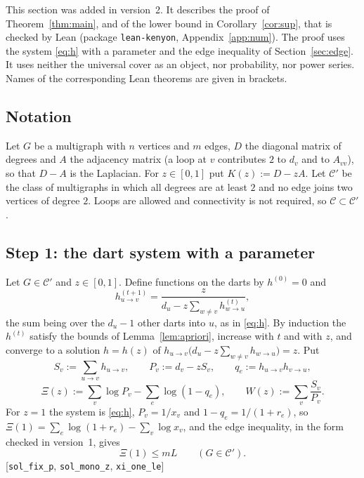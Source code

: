 \documentclass[11pt]{amsart}
\theoremstyle{plain}
\theoremstyle{remark}
\newcommand{\cC}{\mathcal{C}}
\newcommand{\code}[1]{\texttt{#1}}
\begin{document}
This section was added in version~2. It describes the proof of Theorem~\ref{thm:main}, and of the lower bound in
Corollary~\ref{cor:sup}, that is checked by Lean (package \code{lean-kenyon}, Appendix~\ref{app:num}). The proof
uses the system \eqref{eq:h} with a parameter and the edge inequality of Section~\ref{sec:edge}. It uses neither
the universal cover as an object, nor probability, nor power series. Names of the corresponding Lean theorems
are given in brackets.

\subsection*{Notation}
Let $G$ be a multigraph with $n$ vertices and $m$ edges, $D$ the diagonal matrix of degrees and $A$ the adjacency
matrix (a loop at $v$ contributes $2$ to $d_v$ and to $A_{vv}$), so that $D-A$ is the Laplacian. For $z\in[0,1]$
put $K(z):=D-zA$. Let $\cC'$ be the class of multigraphs in which all degrees are at least $2$ and no edge joins
two vertices of degree $2$. Loops are allowed and connectivity is not required, so $\cC\subset\cC'$.

\subsection*{Step 1: the dart system with a parameter}
Let $G\in\cC'$ and $z\in[0,1]$. Define functions on the darts by $h^{(0)}=0$ and
\begin{equation}\label{eq:hz}
  h^{(t+1)}_{u\to v}=\frac{z}{d_u-z\sum_{w\ne v}h^{(t)}_{w\to u}},
\end{equation}
the sum being over the $d_u-1$ other darts into $u$, as in \eqref{eq:h}. By induction the $h^{(t)}$ satisfy the
bounds of Lemma~\ref{lem:apriori}, increase with $t$ and with $z$, and converge to a solution $h=h(z)$ of
$h_{u\to v}\bigl(d_u-z\sum_{w\ne v}h_{w\to u}\bigr)=z$. Put
\[
  S_v:=\sum_{u\to v}h_{u\to v},\qquad P_v:=d_v-zS_v,\qquad q_e:=h_{u\to v}h_{v\to u},
\]
\[
  \Xi(z):=\sum_v\log P_v-\sum_e\log(1-q_e),\qquad W(z):=\sum_v\frac{S_v}{P_v}.
\]
For $z=1$ the system is \eqref{eq:h}, $P_v=1/x_v$ and $1-q_e=1/(1+r_e)$, so
$\Xi(1)=\sum_e\log(1+r_e)-\sum_v\log x_v$, and the edge inequality, in the form checked in version~1, gives
\begin{equation}\label{eq:xi1}
  \Xi(1)\le mL\qquad(G\in\cC').
\end{equation}
[\code{sol\_fix\_p}, \code{sol\_mono\_z}, \code{xi\_one\_le}]
\end{document}
